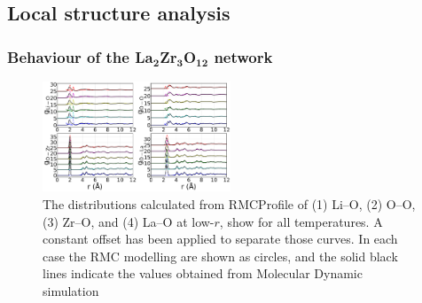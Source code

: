 \documentclass[twoside,twocolumn,9pt]{article}
\begin{document}
\subsection{Local structure analysis}
%
%
%
%

\subsubsection{Behaviour of the La$_\mathbf{2}$Zr$_\mathbf{3}$O$_\mathbf{12}$ network}

\begin{figure}[t]
\centering
\includegraphics[width=0.5\textwidth]{Pics/partialPDFs.pdf}
\caption{The distributions calculated from RMCProfile of (1) Li--O, (2) O--O, (3) Zr--O, and  (4) La--O at low-$r$, show for all temperatures.
A constant offset has been applied to separate those curves. In each case the RMC modelling are shown as circles, and the solid black lines indicate the values obtained from Molecular Dynamic simulation}
\label{fig:partialPDFs}
\end{figure}
\end{document}
